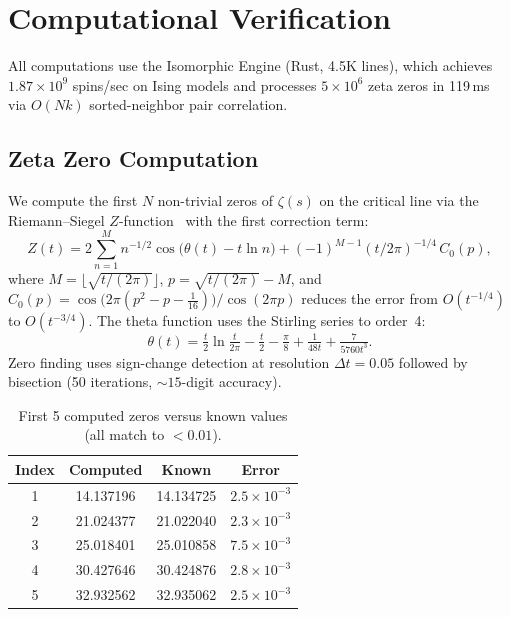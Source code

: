 \documentclass[11pt,a4paper]{article}
\theoremstyle{plain}
\theoremstyle{remark}
\begin{document}
\section{Computational Verification}
\label{sec:verification}

All computations use the Isomorphic Engine (Rust, 4.5K lines), which
achieves $1.87\times 10^9$ spins/sec on Ising models and processes
$5\times 10^6$ zeta zeros in 119\,ms via $O(Nk)$ sorted-neighbor pair
correlation.

\subsection{Zeta Zero Computation}
\label{sec:zeta-zeros}

We compute the first $N$ non-trivial zeros of $\zeta(s)$ on the critical
line via the Riemann--Siegel $Z$-function~\cite{edwards1974} with the first
correction term:
\[
  Z(t) = 2\!\sum_{n=1}^{M} n^{-1/2}\cos\!\bigl(\theta(t) - t\ln n\bigr)
       + (-1)^{M-1}(t/2\pi)^{-1/4}\,C_0(p),
\]
where $M = \lfloor\!\sqrt{t/(2\pi)}\rfloor$, $p = \sqrt{t/(2\pi)} - M$,
and $C_0(p) = \cos\bigl(2\pi(p^2 - p - \tfrac{1}{16})\bigr)/\cos(2\pi p)$
reduces the error from $O(t^{-1/4})$ to $O(t^{-3/4})$.  The theta
function uses the Stirling series to order~4:
\[
  \theta(t) = \tfrac{t}{2}\ln\!\tfrac{t}{2\pi} - \tfrac{t}{2}
            - \tfrac{\pi}{8} + \tfrac{1}{48t} + \tfrac{7}{5760t^3}.
\]
Zero finding uses sign-change detection at resolution $\Delta t=0.05$
followed by bisection (50 iterations, ${\sim}\!15$-digit accuracy).

\begin{table}[H]
\centering
\begin{tabular}{@{}cccc@{}}
\toprule
Index & Computed & Known & Error\\
\midrule
1 & 14.137196 & 14.134725 & $2.5\times 10^{-3}$\\
2 & 21.024377 & 21.022040 & $2.3\times 10^{-3}$\\
3 & 25.018401 & 25.010858 & $7.5\times 10^{-3}$\\
4 & 30.427646 & 30.424876 & $2.8\times 10^{-3}$\\
5 & 32.932562 & 32.935062 & $2.5\times 10^{-3}$\\
\bottomrule
\end{tabular}
\caption{First 5 computed zeros versus known values (all match to $<0.01$).}
\label{tab:zeros}
\end{table}
\end{document}
